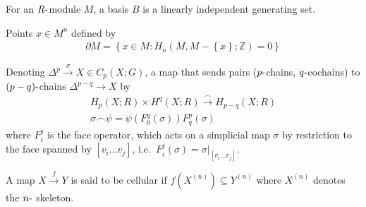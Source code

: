 
\begin{definition}[Basis]

For an \(R{\hbox{-}}\)module \(M\), a basis \(B\) is a linearly
independent generating set.

\end{definition}

\begin{definition}[Boundary]

\end{definition}


\begin{definition}

Points \(x\in M^n\) defined by
\begin{align*}
{\partial}M = \left\{{x\in M: H_{n}(M, M-\left\{{x}\right\}; {\mathbb{Z}}) = 0}\right\}
\end{align*}

\end{definition}

\begin{definition}

Denoting \(\Delta^p \xrightarrow{\sigma} X \in C_{p}(X; G)\), a map that
sends pairs (\(p{\hbox{-}}\)chains, \(q{\hbox{-}}\)cochains) to
\((p-q){\hbox{-}}\)chains \(\Delta^{p-q} \to X\) by
\begin{align*}
H_{p}(X; R)\times H^q(X; R) \xrightarrow{\frown} H_{p-q}(X; R)\\
\sigma \frown \psi = \psi(F_{0}^q(\sigma))F_{q}^p(\sigma)
\end{align*}
where \(F_{i}^j\) is the face operator, which acts on a simplicial map
\(\sigma\) by restriction to the face spanned by
\([v_{i} \ldots v_{j}]\),
i.e.~\(F_{i}^j(\sigma) = {\left.{{\sigma}} \right|_{{[v_{i} \ldots v_{j}]}} }\).

\end{definition}

\begin{definition}

\end{definition}


\begin{definition}

A map \(X \xrightarrow{f} Y\) is said to be cellular if
\(f(X^{(n)}) \subseteq Y^{(n)}\) where \(X^{(n)}\) denotes the
\(n{\hbox{-}}\) skeleton.

\end{definition}

